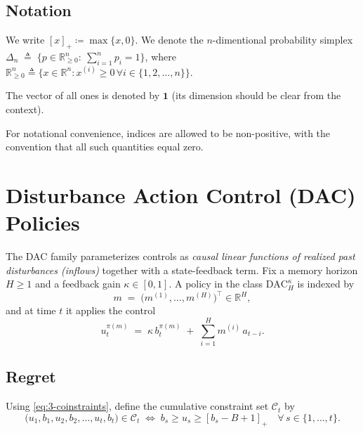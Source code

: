 \documentclass[11pt]{article}
\begin{document}
\subsection{Notation}
We write \([x]_+ \coloneqq \max\{x,0\}\). We denote the $n$-dimentional probability simplex \(\Delta_n \;\triangleq\; \Big\{p\in\mathbb{R}^n_{\ge 0}:\ \sum_{i=1}^n p_i = 1\Big\}\), where $\mathbb{R}^n_{\ge 0} \triangleq \{x \in \mathbb{R}^n : x^{(i)}\geq 0 \,\forall i\in\{1,2,\ldots,n\}\}$.


The vector of all ones is denoted by \(\mathbf{1}\) (its dimension should be clear from the context).


For notational convenience, indices are allowed to be non-positive, with the convention that all such quantities equal zero.



\section{Disturbance Action Control (DAC) Policies}
\label{sec:dac}

The DAC family parameterizes controls as \emph{causal linear functions of realized past disturbances (inflows)} together with a state-feedback term. Fix a memory horizon \(H\ge 1\) and a feedback gain \(\kappa\in[0,1]\). A policy in the class \(\mathrm{DAC}_H^\kappa\) is indexed by
\[
m \;=\; \bigl(m^{(1)},\dots,m^{(H)}\bigr)^\top \in \mathbb{R}^{H},
\]
and at time \(t\) it applies the control
\begin{equation}\label{eq:dac-u}
    u_t^{\pi(m)} \;=\; \kappa\, b_t^{\pi(m)} \;+\; \sum_{i=1}^{H} m^{(i)}\, a_{t-i}.
\end{equation}

\subsection{Regret}
\label{sec:dac-regret}


Using \eqref{eq:3-coinstraints}, define the cumulative constraint set \(\mathcal{C}_t\) by
\begin{equation}
\label{eq:constraints}
\bigl(u_1,b_1,u_2,b_2,\ldots,u_t,b_t\bigr) \in \mathcal{C}_t
\;\Longleftrightarrow\;
b_s \ge u_s \ge [b_s - B + 1]_+ \quad \forall\, s \in \{1,\dots,t\}.
\end{equation}
\end{document}
